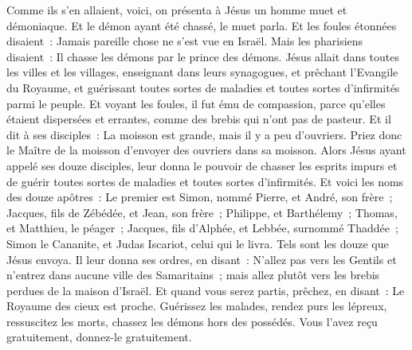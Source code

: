 \begin{multicols}{2}
Comme ils s'en allaient, voici, on présenta à Jésus un homme muet et démoniaque.
Et le démon ayant été chassé, le muet parla. Et les foules étonnées disaient~: Jamais pareille chose ne s'est vue en Israël.
Mais les pharisiens disaient~: Il chasse les démons par le prince des démons.
Jésus allait dans toutes les villes et les villages, enseignant dans leurs synagogues, et prêchant l'Evangile du Royaume, et guérissant toutes sortes de maladies et toutes sortes d'infirmités parmi le peuple.
Et voyant les foules, il fut ému de compassion, parce qu'elles étaient dispersées et errantes, comme des brebis qui n'ont pas de pasteur.
Et il dit à ses disciples~: La moisson est grande, mais il y a peu d'ouvriers.
Priez donc le Maître de la moisson d'envoyer des ouvriers dans sa moisson.
\VerseOne{}Alors Jésus ayant appelé ses douze disciples, leur donna le pouvoir de chasser les esprits impurs et de guérir toutes sortes de maladies et toutes sortes d'infirmités.
Et voici les noms des douze apôtres~: Le premier est Simon, nommé Pierre, et André, son frère~; Jacques, fils de Zébédée, et Jean, son frère~;
Philippe, et Barthélemy~; Thomas, et Matthieu, le péager~; Jacques, fils d'Alphée, et Lebbée, surnommé Thaddée~;
Simon le Cananite, et Judas Iscariot, celui qui le livra.
Tels sont les douze que Jésus envoya. Il leur donna ses ordres, en disant~: N'allez pas vers les Gentils et n'entrez dans aucune ville des Samaritains~;
mais allez plutôt vers les brebis perdues de la maison d'Israël.
Et quand vous serez partis, prêchez, en disant~: Le Royaume des cieux est proche.
Guérissez les malades, rendez purs les lépreux, ressuscitez les morts, chassez les démons hors des possédés. Vous l'avez reçu gratuitement, donnez-le gratuitement.

\end{multicols}
